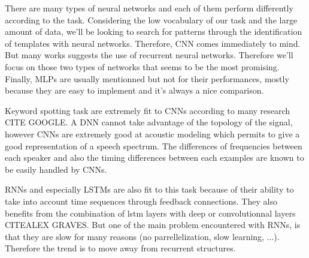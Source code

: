 There are many types of neural networks and each of them perform differently according to the task. Considering the low vocabulary of our task and the large amount of data, we'll be looking to search for patterns through the identification of templates with neural networks. Therefore, CNN comes immediately to mind. But many works suggests the use of recurrent neural networks. Therefore we'll focus on those two types of networks that seems to be the most promising. Finally, MLPs are usually mentionned but not for their performances, mostly because they are easy to implement and it's always a nice comparison.

\vspace{5mm}

Keyword spotting task are extremely fit to CNNs according to many research CITE GOOGLE. A DNN cannot take advantage of the topology of the signal, however CNNs are extremely good at acoustic modeling which permits to give a good representation of a speech spectrum. The differences of frequencies between each speaker and also the timing differences between each examples are known to be easily handled by CNNs.

\vspace{5mm}

RNNs and especially LSTMs are also fit to this task because of their ability to take into account time sequences through feedback connections. They also benefits from the combination of lstm layers with deep or convolutionnal layers CITEALEX GRAVES. But one of the main problem encountered with RNNs, is that they are slow for many reasons (no parrellelization, slow learning, ...). Therefore the trend is to move away from recurrent structures.




